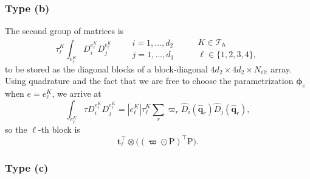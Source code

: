 \documentclass[10pt,english]{article}
\newcommand{\Nelt}{{N_{\mathrm{elt}}}}
\newcommand{\qq}{\widehat{\mathbf q}}
\begin{document}
\subsubsection*{Type (b)}

The second group of matrices is
\[
\tau^K_\ell \int_{e_\ell^K}  D_i^{e_\ell^K}D_j^{e_\ell^K}
\qquad \begin{array}{c}i=1,\ldots,d_2\\
j=1,\ldots,d_3\end{array}\qquad \begin{array}{c}K \in \mathcal T_h\\ \ell\in\{1,2,3,4\},\end{array}
\]
to be stored as the diagonal blocks of a block-diagonal $4d_2\times 4d_2\times \Nelt$ array.
Using quadrature and the fact that we are free to choose the parametrization $\boldsymbol\phi_e$ when $e=e_\ell^K$, we arrive at
\[
\int_{e_\ell^K} \tau D_i^{e_\ell^K}D_j^{e_\ell^K}= |e_\ell^K| \tau_\ell^K \sum_r \varpi_r\widehat D_i(\qq_r)
\widehat D_j(\qq_r),
\]
so the $\ell$-th block is
\[
\mathbf t_\ell^\top \otimes \Big((\boldsymbol\varpi\odot\mathrm P)^\top \mathrm P\Big).
\]

\subsubsection*{Type (c)}
\end{document}
